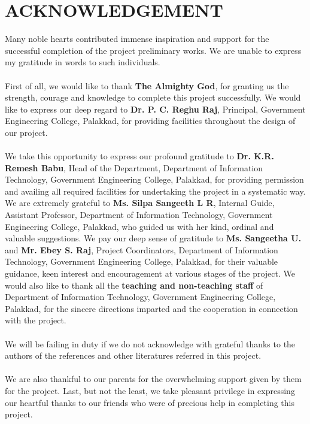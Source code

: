 \documentclass[12pt, a4paper]{report}
\begin{document}
\newpage
{}
\chapter*{ACKNOWLEDGEMENT} \vspace{2pt}

%
\justify
{\large {Many noble hearts contributed immense inspiration and support for the successful completion of the project preliminary works. We are unable to express my gratitude in words to such individuals.\\\\
First of all, we would like to thank \textbf{The Almighty God}, for granting us the strength, courage and knowledge to complete this project successfully. We would like to express our deep regard to\textbf{ Dr. P. C. Reghu Raj}, Principal, Government Engineering College, Palakkad, for providing facilities throughout the design of our project.\\\\
We take this opportunity to express our profound gratitude to\textbf{ Dr. K.R. Remesh Babu}, Head of the Department, Department of Information Technology, Government Engineering College, Palakkad, for providing permission and availing all required facilities for undertaking the project in a systematic way. We are extremely grateful to \textbf{Ms. Silpa Sangeeth L R}, Internal Guide, Assistant Professor, Department of Information Technology, Government Engineering College, Palakkad, who guided us with her kind, ordinal and valuable suggestions. We pay our deep sense of gratitude to \textbf{Ms. Sangeetha U.} and \textbf{Mr. Ebey S. Raj}, Project Coordinators, Department of Information Technology, Government Engineering College, Palakkad, for their valuable guidance, keen interest and encouragement at various stages of the project. We would also like to thank all the\textbf{ teaching and non-teaching staff} of Department of Information Technology, Government Engineering College, Palakkad, for the sincere directions imparted and the cooperation in connection with the project.\\\\
We will be failing in duty if we do not acknowledge with grateful thanks to the authors of the references and other literatures referred in this project.\\\\
We are also thankful to our parents for the overwhelming support given by them for the project. Last, but not the least, we take pleasant privilege in expressing our heartful thanks to our friends who were of precious help in completing this project.
 }}
\end{document}
